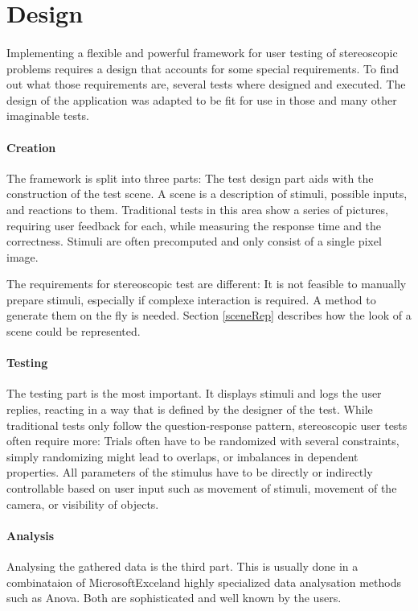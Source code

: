 \section{Design\label{Design}}
\paragraph{}
Implementing a flexible and powerful framework for user testing of stereoscopic problems requires a design that accounts for some special requirements. To find out what those requirements are, several tests where designed and executed. The design of the application was adapted to be fit for use in those and many other imaginable tests.

\paragraph{Creation}
The framework is split into three parts: The test design part aids with the construction of the test scene. A scene is a description of stimuli, possible inputs, and reactions to them. Traditional tests in this area show a series of pictures, requiring user feedback for each, while measuring the response time and the correctness. Stimuli are often precomputed and only consist of a single pixel image.

The requirements for stereoscopic test are different: It is not feasible to manually prepare stimuli, especially if complexe interaction is required. A method to generate them on the fly is needed.
Section \ref{sceneRep} describes how the look of a scene could be represented.

\paragraph{Testing}
The testing part is the most important. It displays stimuli and logs the user replies, reacting in a way that is defined by the designer of the test. While traditional tests only follow the question-response pattern, stereoscopic user tests often require more: Trials often have to be randomized with several constraints, simply randomizing might lead to overlaps, or imbalances in dependent properties. All parameters of the stimulus have to be directly or indirectly controllable based on user input such as movement of stimuli, movement of the camera, or visibility of objects.

\paragraph{Analysis}
Analysing the gathered data is the third part. This is usually done in a combinataion of Microsoft\texttrademark Excel\texttrademark and highly specialized data analysation methods such as Anova. Both are sophisticated and well known by the users.

